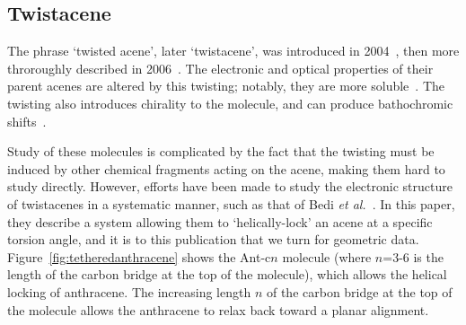 \documentclass[aip,reprint,nofootinbib]{revtex4-1}
\begin{document}
\subsection{Twistacene}
\label{sec:twistacene}

The phrase `twisted acene', later `twistacene', was introduced in 2004~\cite{lu_2004}, then more throroughly described in 2006~\cite{pascal_2006}. The electronic and optical properties of their parent acenes are altered by this twisting; notably, they are more soluble~\cite{xiao2012synthesis}. The twisting also introduces chirality to the molecule, and can produce bathochromic shifts~\cite{bedi_2018}. 

Study of these molecules is complicated by the fact that the twisting must be induced by other chemical fragments acting on the acene, making them hard to study directly. However, efforts have been made to study the electronic structure of twistacenes in a systematic manner, such as that of Bedi \emph{et al.}~\cite{bedi_2018}. In this paper, they describe a system  allowing them to `helically-lock' an acene at a specific torsion angle, and it is to this publication that we turn for geometric data. Figure~\ref{fig:tetheredanthracene} shows the Ant-c$n$ molecule (where $n$=3-6 is the length of the carbon bridge at the top of the molecule), which allows the helical locking of anthracene. The increasing length $n$ of the carbon bridge at the top of the molecule allows the anthracene to relax back toward a planar alignment.
\end{document}
